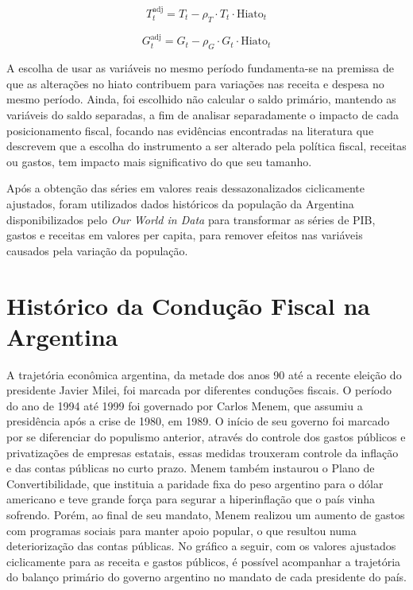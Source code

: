 \documentclass[a4paper, 12pt, openany, oneside, brazil]{abntex2}
\begin{document}
\begin{equation}
	T^\text{adj}_t = T_t - \rho_T \cdot T_t \cdot \text{Hiato}_t
\end{equation}

\begin{equation}
	G^\text{adj}_t = G_t - \rho_G \cdot G_t \cdot \text{Hiato}_t
\end{equation}

A escolha de usar as variáveis no mesmo período fundamenta-se na premissa de que as alterações no hiato contribuem para variações nas receita e despesa no mesmo período. Ainda, foi escolhido não calcular o saldo primário, mantendo as variáveis do saldo separadas, a fim de analisar separadamente o impacto de cada posicionamento fiscal, focando nas evidências encontradas na literatura que descrevem que a escolha do instrumento a ser alterado pela política fiscal, receitas ou gastos, tem impacto mais significativo do que seu tamanho.

Após a obtenção das séries em valores reais dessazonalizados ciclicamente ajustados, foram utilizados dados históricos da população da Argentina disponibilizados pelo \textit{Our World in Data} para transformar as séries de PIB, gastos e receitas em valores per capita, para remover efeitos nas variáveis causados pela variação da população.

\section{Histórico da Condução Fiscal na Argentina}

A trajetória econômica argentina, da metade dos anos 90 até a recente eleição do presidente Javier Milei, foi marcada por diferentes conduções fiscais. O período do ano de 1994 até 1999 foi governado por Carlos Menem, que assumiu a presidência após a crise de 1980, em 1989. O início de seu governo foi marcado por se diferenciar do populismo anterior, através do controle dos gastos públicos e privatizações de empresas estatais, essas medidas trouxeram controle da inflação e das contas públicas no curto prazo. Menem também instaurou o Plano de Convertibilidade, que instituia a paridade fixa do peso argentino para o dólar americano e teve grande força para segurar a hiperinflação que o país vinha sofrendo. Porém, ao final de seu mandato, Menem realizou um aumento de gastos com programas sociais para manter apoio popular, o que resultou numa deteriorização das contas públicas. No gráfico a seguir, com os valores ajustados ciclicamente para as receita e gastos públicos, é possível acompanhar a trajetória do balanço primário do governo argentino no mandato de cada presidente do país.
\end{document}
